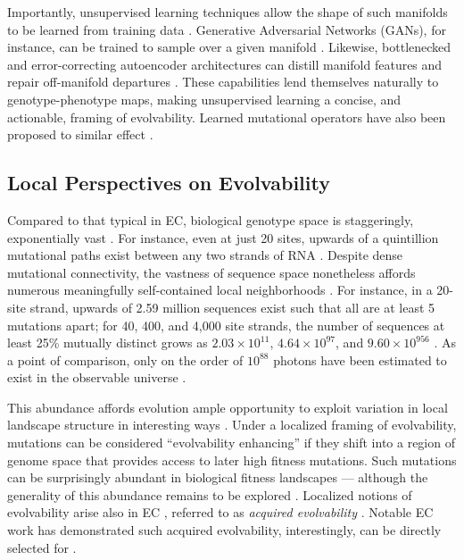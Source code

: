 Importantly, unsupervised learning techniques allow the shape of such manifolds to be learned from training data \citep{radford2015unsupervised,turk1991eigenface,white2016sampling,frowd2004evofit}.
Generative Adversarial Networks (GANs), for instance, can be trained to sample over a given manifold \citep{goodfellow2014generative}.
Likewise, bottlenecked and error-correcting autoencoder architectures can distill manifold features and repair off-manifold departures \citep{hinton2006reducing,vincent2008extracting}.
These capabilities lend themselves naturally to genotype-phenotype maps, making unsupervised learning a concise, and actionable, framing of evolvability.
Learned mutational operators have also been proposed to similar effect \citep{lehman2023evolution,meyerson2024language}.

\subsection{Local Perspectives on Evolvability}

Compared to that typical in EC, biological genotype space is staggeringly, exponentially vast \citep{stadler2007fitness,de2014empirical}.
For instance, even at just 20 sites, upwards of a quintillion mutational paths exist between any two strands of RNA \citep{greenbury2022structure}.
Despite dense mutational connectivity, the vastness of sequence space nonetheless affords numerous meaningfully self-contained local neighborhoods \citep{wagner2017information}.
For instance, in a 20-site strand, upwards of 2.59 million sequences exist such that all are at least 5 mutations apart; for 40, 400, and 4,000 site strands, the number of sequences at least 25\% mutually distinct grows as $2.03 \times 10^{11}$, $4.64 \times 10^{97}$, and $9.60 \times 10^{956}$ \citep{gilbert1952comparison,varshamov1957estimate}.
As a point of comparison, only on the order of $10^{88}$ photons have been estimated to exist in the observable universe \citep{dimopoulos1978baryon}.

This abundance affords evolution ample opportunity to exploit variation in local landscape structure in interesting ways \citep{kumawat2024evolution,barnett2025experimental,steinberg2016environmental,gupta2022hostparasite,ferrare2024evolution,pyo2025evolutionary}.
Under a localized framing of evolvability, mutations can be considered ``evolvability enhancing'' if they shift into a region of genome space that provides access to later high fitness mutations.
Such mutations can be surprisingly abundant in biological fitness landscapes \citep{wagner2023evolvability} --- although the generality of this abundance remains to be explored \citep{ogbunugafor2023mutations}.
Localized notions of evolvability arise also in EC \citep{mengistu2016evolvability,doncieux2020novelty,katona2021quality,lehman2016critical,lehman2013evolvability,reisinger2007acquiring,reisinger2006selecting}, referred to as \textit{acquired evolvability} \citep{reisinger2005towards}.
Notable EC work has demonstrated such acquired evolvability, interestingly, can be directly selected for \citep{mengistu2016evolvability}.

